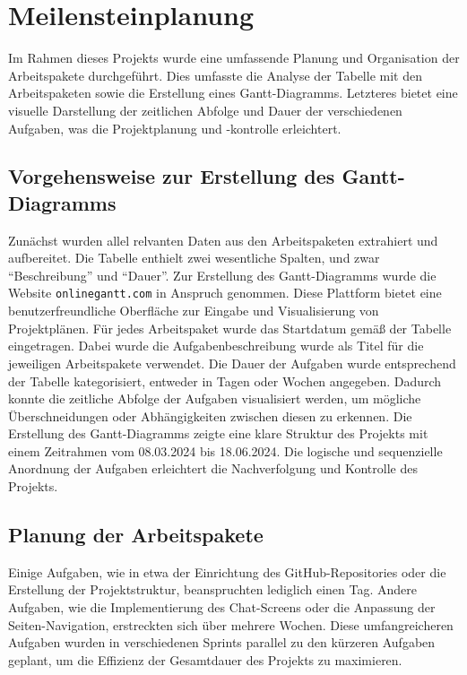 \chapter{Meilensteinplanung}
Im Rahmen dieses Projekts wurde eine umfassende Planung und Organisation der Arbeitspakete durchgeführt. 
Dies umfasste die Analyse der Tabelle mit den Arbeitspaketen sowie die Erstellung eines Gantt-Diagramms. 
Letzteres bietet eine visuelle Darstellung der zeitlichen Abfolge und Dauer der verschiedenen Aufgaben, was die Projektplanung und -kontrolle erleichtert.

\section{Vorgehensweise zur Erstellung des Gantt-Diagramms}
Zunächst wurden allel relvanten Daten aus den Arbeitspaketen extrahiert und aufbereitet.
Die Tabelle enthielt zwei wesentliche Spalten, und zwar \enquote{Beschreibung} und \enquote{Dauer}.
Zur Erstellung des Gantt-Diagramms wurde die Website \texttt{onlinegantt.com} in Anspruch genommen.
Diese Plattform bietet eine benutzerfreundliche Oberfläche zur Eingabe und Visualisierung von Projektplänen. \newline
Für jedes Arbeitspaket wurde das Startdatum gemäß der Tabelle eingetragen.
Dabei wurde die Aufgabenbeschreibung wurde als Titel für die jeweiligen Arbeitspakete verwendet.
Die Dauer der Aufgaben wurde entsprechend der Tabelle kategorisiert, entweder in Tagen oder Wochen angegeben. \newline
Dadurch konnte die zeitliche Abfolge der Aufgaben visualisiert werden, um mögliche Überschneidungen oder Abhängigkeiten zwischen diesen zu erkennen. 
Die Erstellung des Gantt-Diagramms zeigte eine klare Struktur des Projekts mit einem Zeitrahmen vom 08.03.2024 bis 18.06.2024. 
Die logische und sequenzielle Anordnung der Aufgaben erleichtert die Nachverfolgung und Kontrolle des Projekts.

\section{Planung der Arbeitspakete}
Einige Aufgaben, wie in etwa der Einrichtung des GitHub-Repositories oder die Erstellung der Projektstruktur, beanspruchten lediglich einen Tag. 
Andere Aufgaben, wie die Implementierung des Chat-Screens oder die Anpassung der Seiten-Navigation, erstreckten sich über mehrere Wochen.
Diese umfangreicheren Aufgaben wurden in verschiedenen Sprints parallel zu den kürzeren Aufgaben geplant, um die Effizienz der Gesamtdauer des Projekts zu maximieren.

